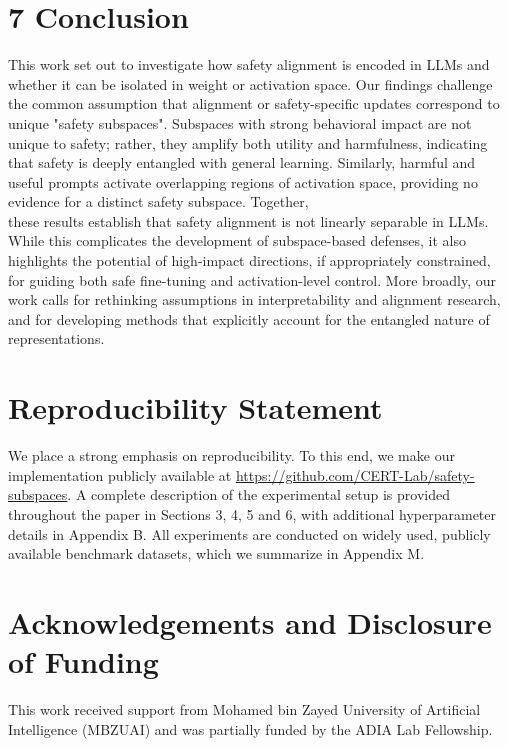 \documentclass[10pt]{article}
\begin{document}
\section*{7 Conclusion}
This work set out to investigate how safety alignment is encoded in LLMs and whether it can be isolated in weight or activation space. Our findings challenge the common assumption that alignment or safety-specific updates correspond to unique "safety subspaces". Subspaces with strong behavioral impact are not unique to safety; rather, they amplify both utility and harmfulness, indicating that safety is deeply entangled with general learning. Similarly, harmful and useful prompts activate overlapping regions of activation space, providing no evidence for a distinct safety subspace. Together,\\
these results establish that safety alignment is not linearly separable in LLMs. While this complicates the development of subspace-based defenses, it also highlights the potential of high-impact directions, if appropriately constrained, for guiding both safe fine-tuning and activation-level control. More broadly, our work calls for rethinking assumptions in interpretability and alignment research, and for developing methods that explicitly account for the entangled nature of representations.

\section*{Reproducibility Statement}
We place a strong emphasis on reproducibility. To this end, we make our implementation publicly available at \href{https://github.com/CERT-Lab/safety-subspaces}{https://github.com/CERT-Lab/safety-subspaces}. A complete description of the experimental setup is provided throughout the paper in Sections 3, 4, 5 and 6, with additional hyperparameter details in Appendix B. All experiments are conducted on widely used, publicly available benchmark datasets, which we summarize in Appendix M.

\section*{Acknowledgements and Disclosure of Funding}
This work received support from Mohamed bin Zayed University of Artificial Intelligence (MBZUAI) and was partially funded by the ADIA Lab Fellowship.
\end{document}

